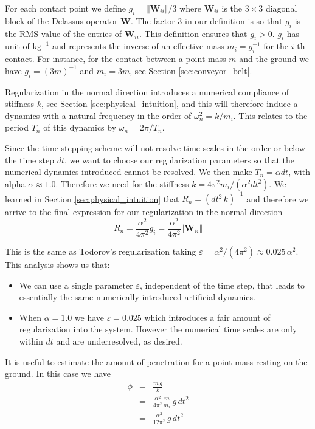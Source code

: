 For each contact point we define $g_i=\Vert\mathbf{W}_{ii}\Vert/3$ where
$\mathbf{W}_{ii}$ is the $3\times 3$ diagonal block of the Delassus operator
$\mathbf{W}$. The factor $3$ in our definition is so that $g_i$ is the RMS value
of the entries of $\mathbf{W}_{ii}$. This definition ensures that $g_i > 0$.
$g_i$ has unit of $\text{kg}^{-1}$ and represents the inverse of an effective
mass $m_i=g_i^{-1}$ for the $i\text{-th}$ contact. For instance, for the contact
between a point mass $m$ and the ground we have $g_i=(3m)^{-1}$ and $m_i=3m$,
see Section \ref{sec:conveyor_belt}. 

Regularization in the normal direction introduces a numerical compliance of
stiffness $k$, see Section \ref{sec:physical_intuition}, and this will therefore
induce a dynamics with a natural frequency in the order of $\omega_n^2=k/m_i$.
This relates to the period $T_n$ of this dynamics by $\omega_n=2\pi/T_n$.

Since the time stepping scheme will not resolve time scales in the order or
below the time step $dt$, we want to choose our regularization parameters so
that the numerical dynamics introduced cannot be resolved. We then make $T_n =
\alpha dt$, with alpha $\alpha \approx 1.0$. Therefore we need for the stiffness
$k=4\pi^2m_i/(\alpha^2 dt^2)$. We learned in Section
\ref{sec:physical_intuition} that $R_n=(dt^2\,k)^{-1}$ and therefore we arrive
to the final expression for our regularization in the normal direction
\begin{equation}
	R_n = \frac{\alpha^2}{4\pi^2}g_i = \frac{\alpha^2}{4\pi^2}\Vert\mathbf{W}_{ii}\Vert
\end{equation}

This is the same as Todorov's regularization taking $\varepsilon =
\alpha^2/(4\pi^2)\approx 0.025\,\alpha^2$. This analysis shows us that:
\begin{itemize}
	\item We can use a single parameter $\varepsilon$, independent of the time
	step, that leads to essentially the same numerically introduced artificial
	dynamics. 
	\item When $\alpha=1.0$ we have $\varepsilon=0.025$ which introduces a fair
	amount of regularization into the system. However the numerical time scales
	are only within $dt$ and are underresolved, as desired.
\end{itemize}

It is useful to estimate the amount of penetration for a point mass resting on
the ground. In this case we have
\begin{eqnarray}
	\phi &=& \frac{m\,g}{k} \nonumber\\
	&=& \frac{\alpha^2}{4\pi^2}\frac{m}{m_i}\,g\,dt^2\nonumber\\
	&=& \frac{\alpha^2}{12\pi^2}\,g\,dt^2
\end{eqnarray}

